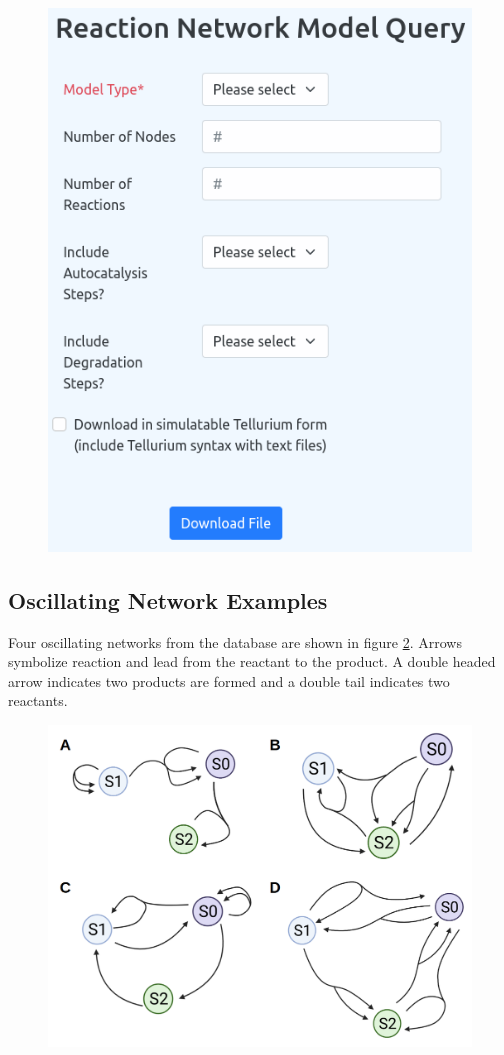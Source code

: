 \documentclass[12pt]{report}
\begin{document}
\begin{figure}
    \centering
    \includegraphics[width=12cm]{images/website.png}
    \label{fig:website}
\end{figure}

\subsection{Oscillating Network Examples}
Four oscillating networks from the database are shown in figure \ref{fig:model-diagrams}. Arrows symbolize reaction and lead from the reactant to the product. A double headed arrow indicates two products are formed and a double tail indicates two reactants. 


\begin{figure}
    \centering
    \includegraphics[width=12cm]{images/model-diagrams.png}
    \label{fig:model-diagrams}
\end{figure}
\end{document}
